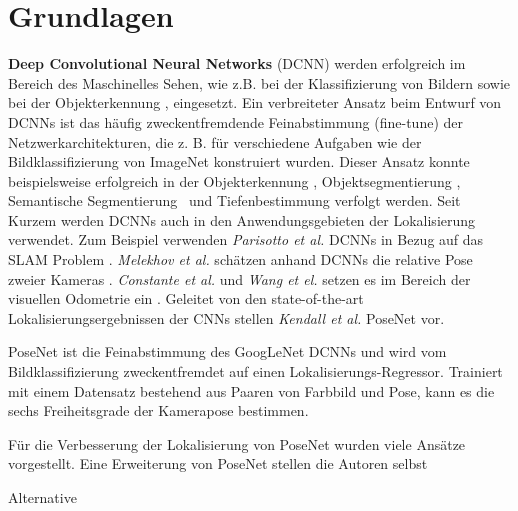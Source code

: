 \pagebreak
\section{Grundlagen}




\pagebreak
\textbf{Deep Convolutional Neural Networks} (DCNN) werden erfolgreich im Bereich des Maschinelles Sehen, wie z.B. bei der Klassifizierung von Bildern \cite{krizhevskyImageNetClassificationDeep2012, simonyanVeryDeepConvolutional2014, heDeepResidualLearning2015} sowie bei der  Objekterkennung \cite{girshickRichFeatureHierarchies2013, renFasterRCNNRealTime2015b, girshickFastRCNN2015},  eingesetzt. 
Ein verbreiteter Ansatz beim Entwurf von DCNNs ist das häufig zweckentfremdende Feinabstimmung (fine-tune) der Netzwerkarchitekturen, die z. B. für verschiedene Aufgaben wie der Bildklassifizierung von ImageNet \cite{russakovskyImageNetLargeScale2014} konstruiert wurden. Dieser Ansatz konnte beispielsweise erfolgreich in der Objekterkennung \cite{girshickFastRCNN2015}, Objektsegmentierung \cite{kokkinosPushingBoundariesBoundary2015, maninisConvolutionalOrientedBoundaries2016}, Semantische Segmentierung \cite{nohLearningDeconvolutionNetwork2015, hazirbasFuseNetIncorporatingDepth2017a} und Tiefenbestimmung \cite{liDepthSurfaceNormal2015} verfolgt werden.
Seit Kurzem werden DCNNs auch in den Anwendungsgebieten der Lokalisierung verwendet. Zum Beispiel verwenden \textit{Parisotto et al.} DCNNs in Bezug auf das SLAM Problem \cite{parisottoGlobalPoseEstimation2018}. \textit{Melekhov et al.} schätzen anhand DCNNs die relative Pose zweier Kameras \cite{melekwashovRelativeCameraPose2017}. \textit{Constante et al.} und \textit{Wang et el.} setzen es im Bereich der visuellen Odometrie ein \cite{costanteExploringRepresentationLearning2016, wangDeepVOEndtoendVisual2017}.
Geleitet von den state-of-the-art Lokalisierungsergebnissen der CNNs stellen \textit{Kendall et al.} PoseNet \cite{kendallPoseNetConvolutionalNetwork2015} vor.

PoseNet ist die Feinabstimmung des GoogLeNet \cite{szegedyGoingDeeperConvolutions2015} DCNNs und wird vom Bildklassifizierung zweckentfremdet auf einen Lokalisierungs-Regressor. Trainiert mit einem Datensatz bestehend aus Paaren von Farbbild und Pose, kann es die sechs Freiheitsgrade der Kamerapose bestimmen.


Für die Verbesserung der Lokalisierung von PoseNet wurden viele Ansätze vorgestellt. Eine Erweiterung von PoseNet stellen die Autoren selbst


Alternative 





% 
